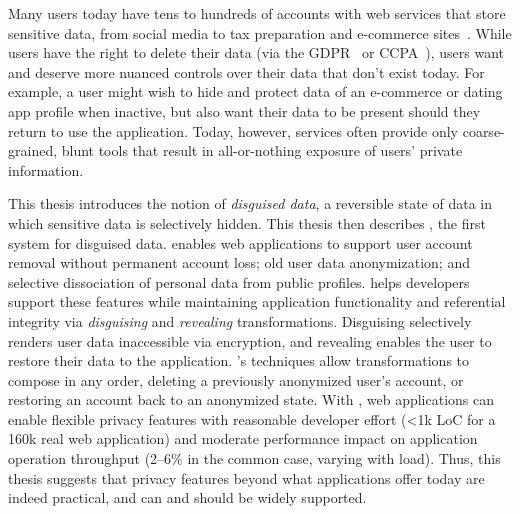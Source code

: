 Many users today have tens to hundreds of accounts with web services that store
sensitive data, from social media to tax preparation and e-commerce
sites~\cite{tens,hundreds,password_life_cycle}.
%
While users have the right to delete their data (via \eg the
GDPR~\cite{eu:gdpr} or CCPA~\cite{ccpa}), users want and deserve more nuanced
controls over their data that don't exist today.
%
For example, a user might wish to hide
and protect data of an e-commerce or dating app profile when inactive, but also
want their data to be present should they return to use the application. 
%
Today, however, services often provide only coarse-grained, blunt tools that
result in all-or-nothing exposure of users’ private information.
%

%
This thesis introduces the notion of \emph{disguised data}, a reversible state
of data in which sensitive data is selectively hidden.
%
This thesis then describes \sys, the first system for disguised data. \sys
enables web applications to support user account removal without permanent
account loss; old user data anonymization; and selective dissociation of
personal data from public profiles.
%
\sys helps developers support these features while maintaining application
functionality and referential integrity via \emph{disguising} and
\emph{revealing} transformations.
%
Disguising selectively renders user data inaccessible via encryption, and
revealing enables the user to restore their data to the application.
%
\sys's techniques allow transformations to compose in any order, \eg deleting a
previously anonymized user's account, or restoring an account back to an
anonymized state.
%
With \sys, web applications can enable flexible privacy features with reasonable
developer effort (<1k LoC for a 160k real web application) and moderate
performance impact on application operation throughput (2--6\% in the common
case, varying with load).  
%
Thus, this thesis suggests that privacy features beyond what applications offer
today are indeed practical, and can and should be widely supported.
%
